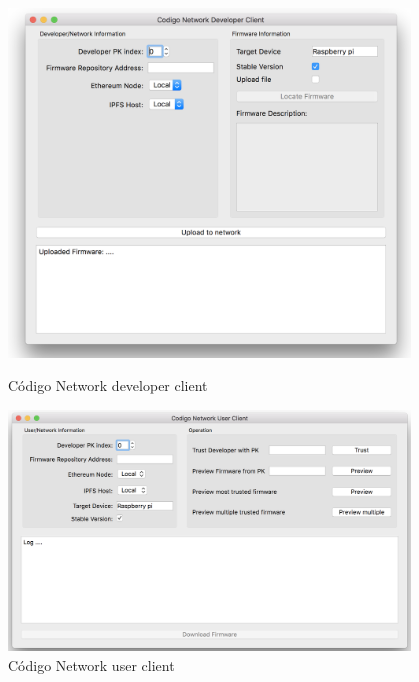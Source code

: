{{{\begin{figure}[h!]
\centering
\includegraphics[width=0.95\textwidth]{./pics/Developer_client.png}
\caption{Código Network developer client}
\label{fig:devClient}
\includegraphics[width=0.95\textwidth]{./pics/user-client.png}
\caption{Código Network user client}
\label{fig:userClient}
\end{figure}
}
}
}